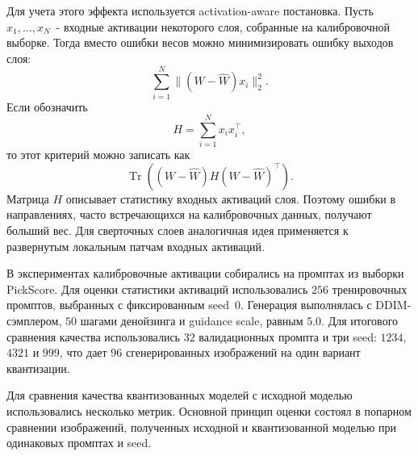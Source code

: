 \documentclass[a4paper,12pt]{article}
\begin{document}
Для учета этого эффекта используется activation-aware постановка. Пусть $x_1,\ldots,x_N$~- входные активации некоторого слоя, собранные на калибровочной выборке. Тогда вместо ошибки весов можно минимизировать ошибку выходов слоя:
\[
    \sum_{i=1}^{N} \|(W-\widehat{W})x_i\|_2^2.
\]
Если обозначить
\[
    H = \sum_{i=1}^{N} x_i x_i^{\top},
\]
то этот критерий можно записать как
\[
    \operatorname{Tr}\left((W-\widehat{W})H(W-\widehat{W})^{\top}\right).
\]
Матрица $H$ описывает статистику входных активаций слоя. Поэтому ошибки в направлениях, часто встречающихся на калибровочных данных, получают больший вес. Для сверточных слоев аналогичная идея применяется к развернутым локальным патчам входных активаций.

В экспериментах калибровочные активации собирались на промптах из выборки PickScore. Для оценки статистики активаций использовались $256$ тренировочных промптов, выбранных с фиксированным seed~$0$. Генерация выполнялась с DDIM-сэмплером, $50$ шагами денойзинга и guidance scale, равным $5.0$. Для итогового сравнения качества использовались $32$ валидационных промпта и три seed: $1234$, $4321$ и $999$, что дает $96$ сгенерированных изображений на один вариант квантизации.

Для сравнения качества квантизованных моделей с исходной моделью использовались несколько метрик. Основной принцип оценки состоял в попарном сравнении изображений, полученных исходной и квантизованной моделью при одинаковых промптах и seed.
\end{document}
